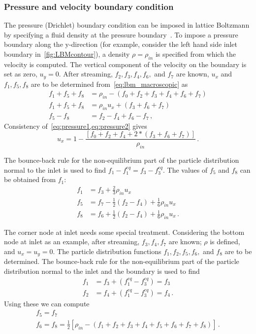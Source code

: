\subsubsection*{Pressure and velocity boundary condition}

The pressure (Drichlet) boundary condition can be imposed in 
lattice Boltzmann by specifying a fluid density at the pressure 
boundary~\citep{Zou1997}. To impose a pressure boundary along 
the y-direction (for example, consider the left hand side inlet boundary 
in~\cref{fig:LBMcontour}), a 
density $\rho = \rho_{in}$ is specified from which the velocity is computed. 
The vertical component of the velocity on the boundary is set as zero, $u_y=0$. 
After streaming, $f_2, f_3, f_4, f_6,$ and $f_7$ are known, $u_x$ and $f_1, 
f_5, f_8$ are to be determined from~\cref{eq:lbm_macroscopic} as
%
\begin{align}
 f_1+f_5+f_8 & =  \rho_{in} - (f_0+f_2+f_3+f_4+f_6+f_7) 
 \label{eq:pressure1}\\
 f_1+f_5+f_8 & =  \rho_{in}u_x + (f_3+f_6+f_7) 
 \label{eq:pressure2} \\
 f_5 - f_8  & =  f_2 - f_4 +f_6 -f_7\,,
\end{align}
%
\noindent Consistency of~\cref{eq:pressure1,eq:pressure2} gives
%
\begin{equation}
u_x  = 1 - \frac{[f_0+f_2+f_4+2*(f_3+f_6+f_7)]}{\rho_{in}}\,.
\end{equation}

The bounce-back rule for the non-equilibrium part of the 
particle distribution normal to the inlet is used to find $f_1 
-f_1^{eq} = f_3 -f_3^{eq}$. The values of $f_5$ and $f_8$ can 
be obtained from $f_1$:
%
\begin{align}
f_1 & = f_3 + \frac{2}{3} \rho_{in}u_x \nonumber \\ 
f_5 & = f_7 - \frac{1}{2}(f_2 - f_4) + \frac{1}{6}\rho_{in}u_x\nonumber \\ 
f_8 & = f_6 + \frac{1}{2}(f_2 - f_4) + \frac{1}{6}\rho_{in}u_x\,.
\end{align}

The corner node at inlet needs some special treatment. 
Considering the bottom node at inlet as an example, after 
streaming, $f_3, f_4, f_7$ are known; $\rho$ is 
defined, and $u_x = u_y = 0$. The particle distribution 
functions $f_1, f_2, f_5, f_6, $ and  $f_8$ are to be determined. The 
bounce-back rule for the non-equilibrium part of the particle 
distribution normal to the inlet and the boundary is used to 
find
%
\begin{align}
f_1 & = f_3 + (f_1^{eq}-f_3^{eq}) = f_3 \\
f_2 & = f_4 + (f_1^{eq}-f_3^{eq}) = f_4 \,.
\end{align}
%
\noindent Using these we can compute
%
\begin{gather}
f_5 = f_7 \\
f_6 = f_8 = \frac{1}{2}[\rho_{in} - (f_1 + f_2 + f_3 + f_4 + f_5 + f_6 + f_7 + 
f_8)]\,.
\end{gather}

